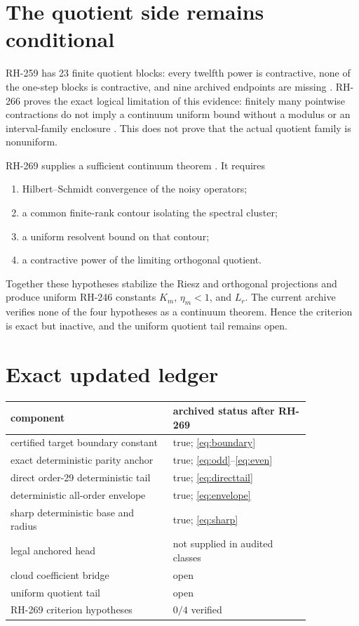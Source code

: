 \documentclass[11pt]{article}
\theoremstyle{definition}
\theoremstyle{remark}
\begin{document}
\section{The quotient side remains conditional}

RH-259 has 23 finite quotient blocks: every twelfth power is contractive,
none of the one-step blocks is contractive, and nine archived endpoints are
missing \citep{WangRH259}.  RH-266 proves the exact logical limitation of
this evidence: finitely many pointwise contractions do not imply a continuum
uniform bound without a modulus or an interval-family enclosure
\citep{WangRH266}.  This does not prove that the actual quotient family is
nonuniform.

RH-269 supplies a sufficient continuum theorem \citep{WangRH246,WangRH269}.
It requires
\begin{enumerate}[label=(\roman*)]
 \item Hilbert--Schmidt convergence of the noisy operators;
 \item a common finite-rank contour isolating the spectral cluster;
 \item a uniform resolvent bound on that contour;
 \item a contractive power of the limiting orthogonal quotient.
\end{enumerate}
Together these hypotheses stabilize the Riesz and orthogonal projections and
produce uniform RH-246 constants $K_m$, $\eta_m<1$, and $L_r$.  The current
archive verifies none of the four hypotheses as a continuum theorem.  Hence
the criterion is exact but inactive, and the uniform quotient tail remains
open.

\section{Exact updated ledger}

\begin{center}
\small
\begin{tabular}{p{0.46\linewidth}p{0.39\linewidth}}
\toprule
component & archived status after RH-269 \\
\midrule
certified target boundary constant & true; \eqref{eq:boundary} \\
exact deterministic parity anchor & true; \eqref{eq:odd}--\eqref{eq:even} \\
direct order-29 deterministic tail & true; \eqref{eq:directtail} \\
deterministic all-order envelope & true; \eqref{eq:envelope} \\
sharp deterministic base and radius & true; \eqref{eq:sharp} \\
legal anchored head & not supplied in audited classes \\
cloud coefficient bridge & open \\
uniform quotient tail & open \\
RH-269 criterion hypotheses & $0/4$ verified \\
\bottomrule
\end{tabular}
\end{center}
\end{document}
